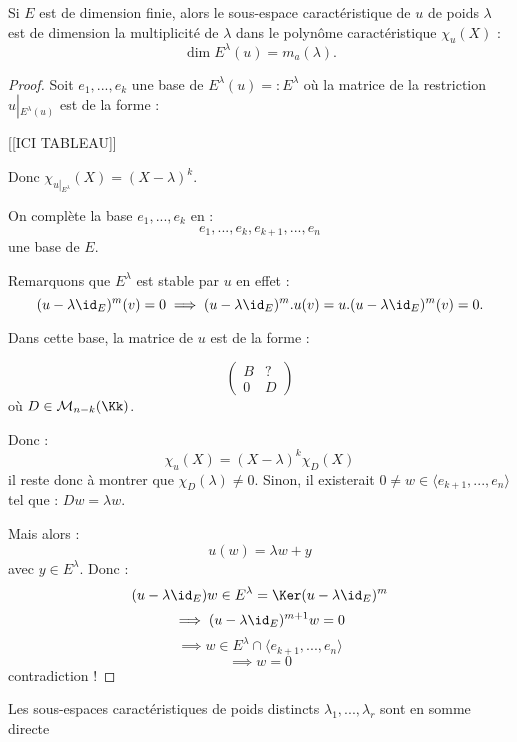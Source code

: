 \documentclass[class=report,crop=false]{standalone}
\newcommand{\Res}[1]{{\left | {}_{#1} \right.}}
\begin{document}
\begin{proposition}
Si $E$ est de dimension finie, alors le sous-espace caractéristique de $u$ de poids $\lambda$ est de dimension la multiplicité de $\lambda$ dans le polynôme caractéristique $\chi_u(X)$ :
\[\dim E^\lambda(u)= m_a(\lambda).\]
\end{proposition}
\begin{proof}
Soit $e_1,...,e_k$ une base de $E^\lambda(u)=:E^\lambda$ où la matrice de la restriction $u\Res{E^\lambda(u)}$ est de la forme :

[[ICI TABLEAU]]
%

Donc $\chi_{u\Res{E^\lambda}}(X) = (X-\lambda)^{k}$.

 On complète la base $e_1,...,e_k$ en :
\[e_1,...,e_k,e_{k+1},...,e_n\]
une base de $E$. 

Remarquons que $E^\lambda$ est stable par $u$ en effet :
\[(u-\lambda\id_E)^m(v) = 0 \implies (u-\lambda\id_E)^m.u (v) = u. (u-\lambda\id_E)^m (v) = 0 .\]


Dans cette base, la matrice de $u$ est de la forme :

\[\left(
\begin{array}{c|c}
B & ?\\\hline
0 & D
\end{array}
\right)\]
où $D \in \mathcal{M}_{n-k}(\Kk)$.

Donc :
\[\chi_u(X) = (X-\lambda)^k \chi_D(X)\]
il reste donc à montrer que $\chi_D(\lambda) \neq 0$. Sinon, il existerait $0\neq w \in \langle e_{k+1},...,e_n\rangle$ tel que : $D w = \lambda w$.

Mais alors : \[u(w) = \lambda w + y \]
avec $y \in E^\lambda$. Donc : \[(u-\lambda\id_E) w \in E^\lambda = \Ker(u-\lambda\id_E)^m\]
\[\implies (u-\lambda\id_E)^{m+1} w = 0\]
\[\implies w \in E^\lambda \cap \langle e_{k+1} ,..., e_n \rangle \]
\[\implies w =0\]
contradiction !
\end{proof}

\begin{proposition}
Les sous-espaces caractéristiques de poids distincts $\lambda_1,...,\lambda_r$ sont en somme directe
\end{proposition}
\end{document}
